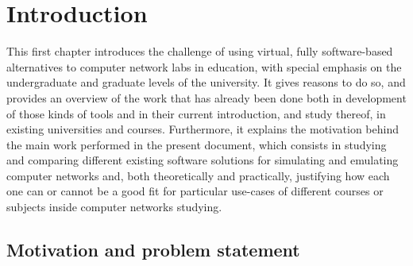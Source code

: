 
\chapter{Introduction}
\label{ch:introduction}

This first chapter introduces the challenge of using virtual, fully software-based alternatives to computer network labs in education, with special emphasis on the undergraduate and graduate levels of the university. %
It gives reasons to do so, and provides an overview of the work that has already been done both in development of those kinds of tools and in their current introduction, and study thereof, in existing universities and courses.
Furthermore, it explains the motivation behind the main work performed in the present document, which consists in studying and comparing different existing software solutions for simulating and emulating computer networks and, both theoretically and practically, justifying how each one can or cannot be a good fit for particular use-cases of different courses or subjects inside computer networks studying.


\section{Motivation and problem statement}
\label{sec:motivation}

